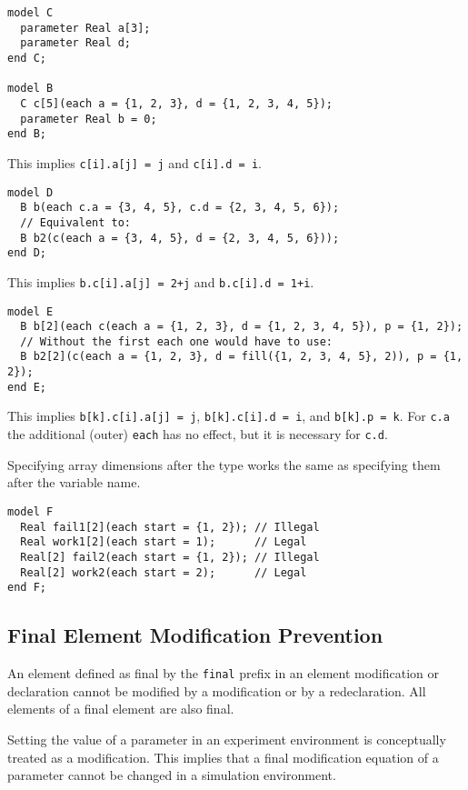 \begin{example}
\begin{lstlisting}[language=modelica]
model C
  parameter Real a[3];
  parameter Real d;
end C;

model B
  C c[5](each a = {1, 2, 3}, d = {1, 2, 3, 4, 5});
  parameter Real b = 0;
end B;
\end{lstlisting}
This implies \lstinline!c[i].a[j] = j! and \lstinline!c[i].d = i!.

\begin{lstlisting}[language=modelica]
model D
  B b(each c.a = {3, 4, 5}, c.d = {2, 3, 4, 5, 6});
  // Equivalent to:
  B b2(c(each a = {3, 4, 5}, d = {2, 3, 4, 5, 6}));
end D;
\end{lstlisting}
This implies \lstinline!b.c[i].a[j] = 2+j! and \lstinline!b.c[i].d = 1+i!.
\begin{lstlisting}[language=modelica]
model E
  B b[2](each c(each a = {1, 2, 3}, d = {1, 2, 3, 4, 5}), p = {1, 2});
  // Without the first each one would have to use:
  B b2[2](c(each a = {1, 2, 3}, d = fill({1, 2, 3, 4, 5}, 2)), p = {1, 2});
end E;
\end{lstlisting}
This implies \lstinline!b[k].c[i].a[j] = j!, \lstinline!b[k].c[i].d = i!, and \lstinline!b[k].p = k!.  For \lstinline!c.a! the additional (outer) \lstinline!each! has no effect, but it is necessary for \lstinline!c.d!.

Specifying array dimensions after the type works the same as specifying them after the variable name.
\begin{lstlisting}[language=modelica]
model F
  Real fail1[2](each start = {1, 2}); // Illegal
  Real work1[2](each start = 1);      // Legal
  Real[2] fail2(each start = {1, 2}); // Illegal
  Real[2] work2(each start = 2);      // Legal
end F;
\end{lstlisting}
\end{example}

\subsection{Final Element Modification Prevention}\label{final-element-modification-prevention}

An element defined as final by the \lstinline!final! prefix in an element modification or declaration cannot be modified by a modification or by a redeclaration.  All elements of a final element are also final.

\begin{nonnormative}
Setting the value of a parameter in an experiment environment is conceptually treated as a modification.  This implies that a final modification equation
of a parameter cannot be changed in a simulation environment.
\end{nonnormative}

